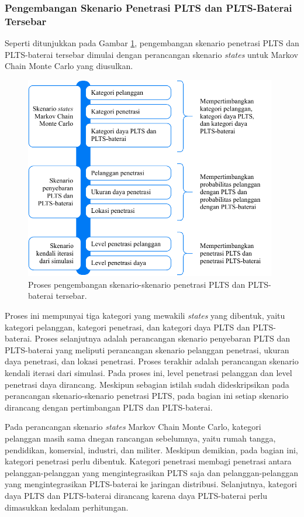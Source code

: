 {\subsubsection{Pengembangan Skenario Penetrasi PLTS dan PLTS-Baterai Tersebar}
Seperti ditunjukkan pada Gambar \ref{stage3-1}, pengembangan skenario penetrasi PLTS dan PLTS-baterai tersebar dimulai dengan perancangan skenario \textit{states} untuk Markov Chain Monte Carlo yang diusulkan.
\begin{figure}[!h]
	\centering
	\includegraphics[width=0.98\textwidth]{Fig/stage3-1}
	\caption{Proses pengembangan skenario-skenario penetrasi PLTS dan PLTS-baterai tersebar.}
	\label{stage3-1}
\end{figure}
Proses ini mempunyai tiga kategori yang mewakili \textit{states} yang dibentuk, yaitu kategori pelanggan, kategori penetrasi, dan kategori daya PLTS dan PLTS-baterai. Proses selanjutnya adalah perancangan skenario penyebaran PLTS dan PLTS-baterai yang meliputi perancangan skenario pelanggan penetrasi, ukuran daya penetrasi, dan lokasi penetrasi. Proses terakhir adalah perancangan skenario kendali iterasi dari simulasi. Pada proses ini, level penetrasi pelanggan dan level penetrasi daya dirancang. Meskipun sebagian istilah sudah dideskripsikan pada perancangan skenario-skenario penetrasi PLTS, pada bagian ini setiap skenario dirancang dengan pertimbangan PLTS dan PLTS-baterai.

Pada perancangan skenario \textit{states} Markov Chain Monte Carlo, kategori pelanggan masih sama dnegan rancangan sebelumnya, yaitu rumah tangga, pendidikan, komersial, industri, dan militer. Meskipun demikian, pada bagian ini, kategori penetrasi perlu dibentuk. Kategori penetrasi membagi penetrasi antara pelanggan-pelanggan yang mengintegrasikan PLTS saja dan pelanggan-pelanggan yang mengintegrasikan PLTS-baterai ke jaringan distribusi. Selanjutnya, kategori daya PLTS dan PLTS-baterai dirancang karena daya PLTS-baterai perlu dimasukkan kedalam perhitungan.

}
